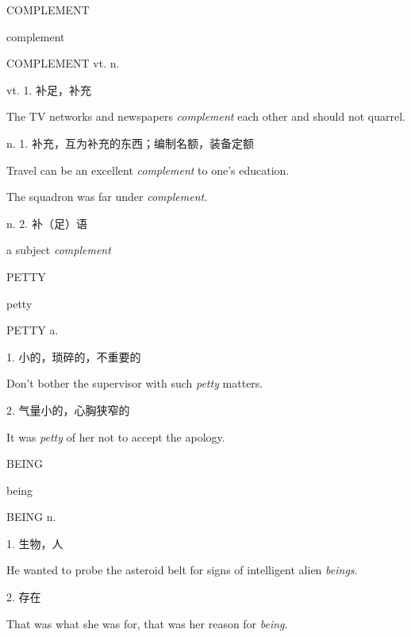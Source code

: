 \begin{flashcard}{
COMPLEMENT

complement
}
\begin{center}
COMPLEMENT vt.  n. 
\end{center}
vt. 1. 补足，补充

The TV networks and newspapers \textit{complement} each other and should not quarrel.

n. 1. 补充，互为补充的东西；编制名额，装备定额

Travel can be an excellent \textit{complement} to one's education.

The squadron was far under \textit{complement}.

n. 2. 补（足）语

a subject \textit{complement}

\end{flashcard}
\begin{flashcard}{
PETTY

petty
}
\begin{center}
PETTY a. 
\end{center}
1. 小的，琐碎的，不重要的

Don't bother the supervisor with such \textit{petty} matters.

2. 气量小的，心胸狭窄的

It was \textit{petty} of her not to accept the apology.

\end{flashcard}
\begin{flashcard}{
BEING

being
}
\begin{center}
BEING n. 
\end{center}
1. 生物，人

He wanted to probe the asteroid belt for signs of intelligent alien \textit{beings}.

2. 存在

That was what she was for, that was her reason for \textit{being}.

\end{flashcard}
